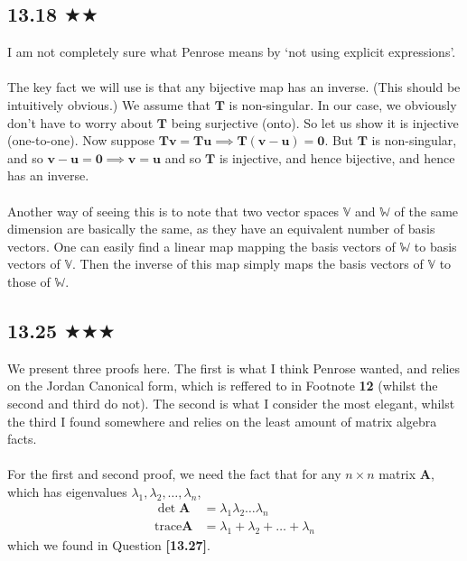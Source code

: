 \subsection{13.18 $\bigstar \bigstar $}
I am not completely sure what Penrose means by `not using explicit expressions'. \\ \\ The key fact we will use is that any bijective map has an inverse. (This should be intuitively obvious.) We assume that $\mathbf{T}$ is non-singular. In our case, we obviously don't have to worry about $\mathbf{T}$ being surjective (onto). So let us show it is injective (one-to-one). Now suppose $\mathbf{T}\mathbf{v}=\mathbf{T}\mathbf{u}\implies \mathbf{T}(\mathbf{v}-\mathbf{u})=\mathbf{0}
$. But $\mathbf{T}$ is non-singular, and so $\mathbf{v}-\mathbf{u}=\mathbf{0}\implies \mathbf{v}=\mathbf{u}$ and so $\mathbf{T}$ is injective, and hence bijective, and hence has an inverse.\\ \\ Another way of seeing this is to note that two vector spaces $\mathbb{V}$ and $\mathbb{W}$ of the same dimension are basically the same, as they have an equivalent number of basis vectors. One can easily find a linear map mapping the basis vectors of $\mathbb{W}$ to basis vectors of $\mathbb{V}$. Then the inverse of this map simply maps the basis vectors of $\mathbb{V}$ to those of $\mathbb{W}$.


\subsection{13.25 $\bigstar\bigstar\bigstar$}
We present three proofs here. The first is what I think Penrose wanted, and relies on the Jordan Canonical form, which is reffered to in Footnote \textbf{12} (whilst the second and third do not). The second is what I consider the most elegant, whilst the third I found somewhere and relies on the least amount of matrix algebra facts.\\ \\ For the first and second proof, we need the fact that for any $n\times n$ matrix $\mathbf{A}$, which has eigenvalues $\lambda_1,\lambda_2,\ldots,\lambda_n$, 
\begin{align*}
\det \mathbf{A}&=\lambda_1\lambda_2\ldots\lambda_n\\
\text{trace}\mathbf{A}&=\lambda_1+\lambda_2+\ldots+\lambda_n
\end{align*} 
which we found in Question \textbf{[13.27]}.
